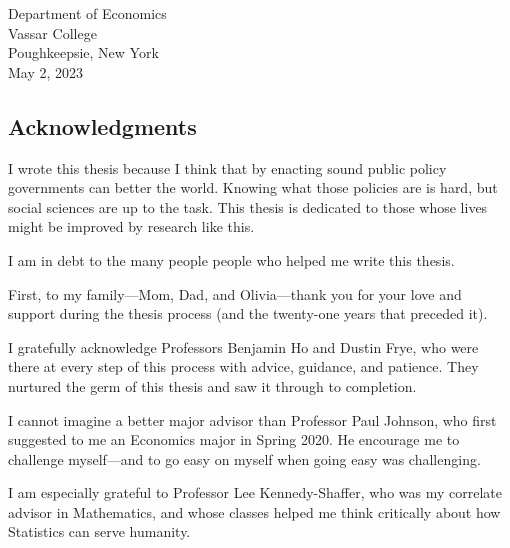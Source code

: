 \documentclass[11pt]{article}
\begin{document}
\begin{titlepage}
\begin{center}	
Department of Economics\\
Vassar College\\
Poughkeepsie, New York\\
May 2, 2023\\
\end{center}
\end{titlepage}
\singlespacing
\setcounter{page}{2}
\tableofcontents
\pagebreak
\listoffigures
\listoftables
\pagebreak

    

\doublespacing

\begin{center}\section*{Acknowledgments}\end{center}

I wrote this thesis because I think that by enacting sound public policy governments can better the world. Knowing what those policies are is hard, but social sciences are up to the task. This thesis is dedicated to those whose lives might be improved by research like this.

I am in debt to the many people people who helped me write this thesis.

First, to my family---Mom, Dad, and Olivia---thank you for your love and support during the thesis process (and the twenty-one years that preceded it).

I gratefully acknowledge Professors Benjamin Ho and Dustin Frye, who were there at every step of this process with advice, guidance, and patience. They nurtured the germ of this thesis and saw it through to completion.

I cannot imagine a better major advisor than Professor Paul Johnson, who first suggested to me an Economics major in Spring 2020. He encourage me to challenge myself---and to go easy on myself when going easy was challenging.

I am especially grateful to Professor Lee Kennedy-Shaffer, who was my correlate advisor in Mathematics, and whose classes helped me think critically about how Statistics can serve humanity.


\pagebreak

\doublespacing
\end{document}
